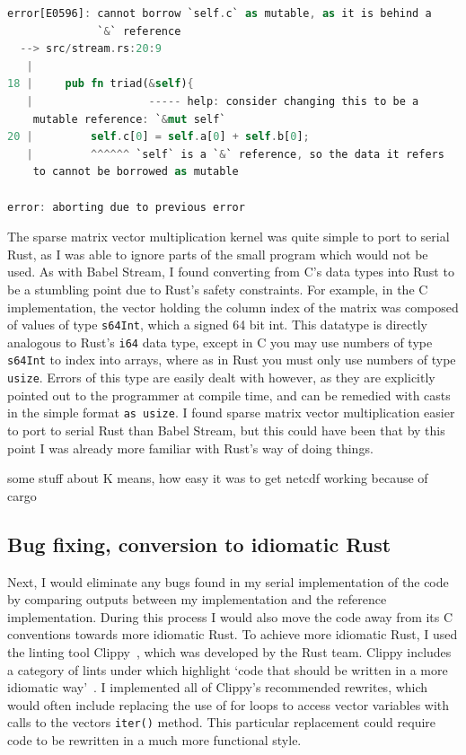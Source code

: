 \begin{lstlisting}[language=Rust,label=lst:comp-help,caption=Help from the Rust compiler]
error[E0596]: cannot borrow `self.c` as mutable, as it is behind a
              `&` reference
  --> src/stream.rs:20:9
   |
18 |     pub fn triad(&self){
   |                  ----- help: consider changing this to be a
    mutable reference: `&mut self`
20 |         self.c[0] = self.a[0] + self.b[0];
   |         ^^^^^^ `self` is a `&` reference, so the data it refers
    to cannot be borrowed as mutable

error: aborting due to previous error
\end{lstlisting}

The sparse matrix vector multiplication kernel was quite simple to port to serial Rust, as I was able to ignore parts of the small program which would not be used. As with Babel Stream, I found converting from C's data types into Rust to be a stumbling point due to Rust's safety constraints. For example, in the C implementation, the vector holding the column index of the matrix was composed of values of type \texttt{s64Int}, which a signed 64 bit int. This datatype is directly analogous to Rust's \texttt{i64} data type, except in C you may use numbers of type \texttt{s64Int} to index into arrays, where as in Rust you must only use numbers of type \texttt{usize}. Errors of this type are easily dealt with however, as they are explicitly pointed out to the programmer at compile time, and can be remedied with casts in the simple format \texttt{as usize}. I found sparse matrix vector multiplication easier to port to serial Rust than Babel Stream, but this could have been that by this point I was already more familiar with Rust's way of doing things.

some stuff about K means, how easy it was to get netcdf working because of cargo

\subsection{Bug fixing, conversion to idiomatic Rust}
Next, I would eliminate any bugs found in my serial implementation of the code by comparing outputs between my implementation and the reference implementation. During this process I would also move the code away from its C conventions towards more idiomatic Rust. To achieve more idiomatic Rust, I used the linting tool Clippy~\cite{RustClippy}, which was developed by the Rust team.  Clippy includes a category of lints under  which highlight `code that should be written in a more idiomatic way'~\cite{RustClippy}. I implemented all of Clippy's recommended rewrites, which would often include replacing the use of for loops to access vector variables with calls to the vectors \texttt{iter()} method. This particular replacement could require code to be rewritten in a much more functional style.


